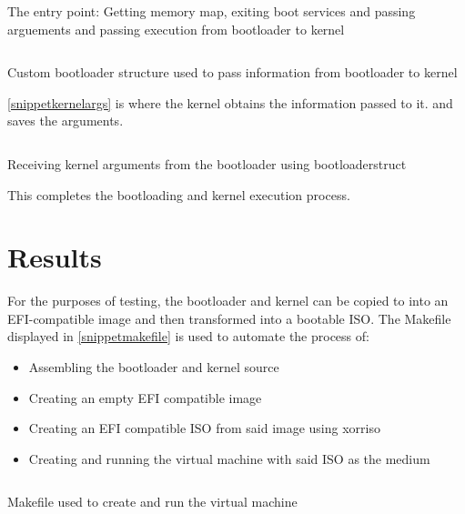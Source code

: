 \documentclass[conference]{IEEEtran}
\begin{document}
\begin{listing}[!t]
    \inputminted[breaklines,breakanywhere,frame=single]{nasm}{snippetexit.asm}
    \caption{The entry point: Getting memory map, exiting boot services and passing arguements and passing execution from bootloader to kernel}
    \label{snippetexit}
\end{listing}

\begin{listing}[!t]
    \inputminted[breaklines,breakanywhere,frame=single]{nasm}{snippetbootloaderstruct.asm}
    \caption{Custom bootloader structure used to pass information from bootloader to kernel}
    \label{snippetbootloaderstruct}
\end{listing}

\ref{snippetkernelargs} is where the kernel obtains the information passed to it. and saves the arguments.

\begin{listing}[!t]
    \inputminted[breaklines,breakanywhere,frame=single]{nasm}{snippetkernelargs.asm}
    \caption{Receiving kernel arguments from the bootloader using bootloaderstruct}
    \label{snippetkernelargs}
\end{listing}

This completes the bootloading and kernel execution process.

\section{Results}

For the purposes of testing, the bootloader and kernel can be copied to into an EFI-compatible image and then transformed into a bootable ISO. The Makefile displayed in \ref{snippetmakefile} is used to automate the process of:

\begin{itemize}
    \item Assembling the bootloader and kernel source
    \item Creating an empty EFI compatible image
    \item Creating an EFI compatible ISO from said image using xorriso
    \item Creating and running the virtual machine with said ISO as the medium
\end{itemize}

\begin{listing}[!t]
    \inputminted[breaklines,breakanywhere,frame=single]{nasm}{snippetmakefile.txt}
    \caption{Makefile used to create and run the virtual machine}
    \label{snippetmakefile}
\end{listing}
\end{document}
